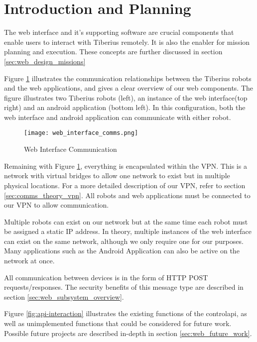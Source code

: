 \section{Introduction and Planning}

The web interface and it's supporting software are crucial components that enable users to interact with Tiberius remotely. It is also the enabler for mission planning and execution. These concepts are further discussed in section \ref{sec:web_design_missions}

Figure \ref{fig:web-interface-communication} illustrates the communication relationships between the Tiberius robots and the web applications, and gives a clear overview of our web components. The figure illustrates two Tiberius robots (left), an instance of the web interface(top right) and an android application (bottom left). In this configuration, both the web interface and android application can communicate with either robot.

\begin{figure}[!htb]
\begin{center}
\texttt{[image: web\_interface\_comms.png]}
\end{center}
\caption{Web Interface Communication}
\label{fig:web-interface-communication}
\end{figure}


Remaining with Figure \ref{fig:web-interface-communication}, everything is encapsulated within the \gls{VPN}. This is a network with virtual bridges to allow one network to exist but in multiple physical locations. For a more detailed description of our \gls{VPN}, refer to section \ref{sec:comms_theory_vpn}. All robots and web applications must be connected to our \gls{VPN} to allow communication.

Multiple robots can exist on our network but at the same time each robot must be assigned a static IP address. In theory, multiple instances of the web interface can exist on the same network, although we only require one for our purposes. Many applications such as the Android Application can also be active on the network at once.

All communication between devices is in the form of \gls{HTTP} \gls{POST} requests/responses. The security benefits of this message type are described in section \ref{sec:web_subsystem_overview}.

Figure \ref{fig:api-interaction} illustrates the existing functions of the \gls{controlapi}, as well as unimplemented functions that could be considered for future work. Possible future projects are described in-depth in section \ref{sec:web_future_work}.

